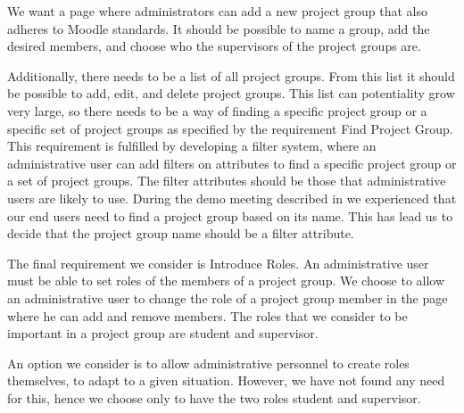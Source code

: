 We want a page where administrators can add a new project group that also adheres to Moodle standards.
It should be possible to name a group, add the desired members, and choose who the supervisors of the project groups are.

Additionally, there needs to be a list of all project groups.
From this list it should be possible to add, edit, and delete project groups. 
This list can potentiality grow very large, so there needs to be a way of finding a specific project group or a specific set of project groups as specified by the requirement Find Project Group.
This requirement is fulfilled by developing a filter system, where an administrative user can add filters on attributes to find a specific project group or a set of project groups.
The filter attributes should be those that administrative users are likely to use.
During the demo meeting described in  we experienced that our end users need to find a project group based on its name.
This has lead us to decide that the project group name should be a filter attribute.

The final requirement we consider is Introduce Roles.
An administrative user must be able to set roles of the members of a project group.
We choose to allow an administrative user to change the role of a project group member in the page where he can add and remove members.
The roles that we consider to be important in a project group are student and supervisor.

An option we consider is to allow administrative personnel to create roles themselves, to adapt to a given situation.
However, we have not found any need for this, hence we choose only to have the two roles student and supervisor.






